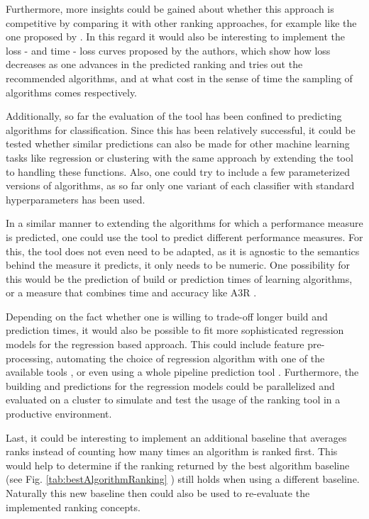 Furthermore, more insights could be gained about whether this approach is competitive by comparing it with other ranking approaches, for example like the one proposed by \citeauthor{DBLP:journals/ml/AbdulrahmanBRV18} \cite{DBLP:journals/ml/AbdulrahmanBRV18}. In this regard it would also be interesting  to implement the loss - and time - loss curves proposed by the authors, which show how loss decreases as one advances in the predicted ranking and tries out the recommended algorithms, and at what cost in the sense of time the sampling of algorithms comes respectively.

Additionally, so far the evaluation of the tool has been confined to predicting algorithms for classification. Since this has been relatively successful, it could be tested whether similar predictions can also be made for other machine learning tasks like regression or clustering with the same approach by extending the tool to handling these functions. Also, one could try to include a few parameterized versions of algorithms, as so far only one variant of each classifier with standard hyperparameters has been used. 

In a similar manner to extending the algorithms for which a performance measure is predicted, one could use the tool to predict different performance measures. For this, the tool does not even need to be adapted, as it is agnostic to the semantics behind the measure it predicts, it only needs to be numeric. One possibility for this would be the prediction of build or prediction times of learning algorithms, or a measure that combines time and accuracy like A3R \cite{DBLP:journals/ml/AbdulrahmanBRV18}.

Depending on the fact whether one is willing to trade-off longer build and prediction times, it would also be possible to fit more sophisticated regression models for the regression based approach. This could include feature pre-processing, automating the choice of regression algorithm with one of the available tools \cite{thornton2013auto} \cite{feurer2015efficient}, or even using a whole pipeline prediction tool \cite{wever2017automatic} \cite{DBLP:conf/eurogp/SaPOP17}. Furthermore, the building and predictions for the regression models could be parallelized and evaluated on a cluster to simulate and test  the usage of the ranking tool in a productive environment.

Last, it could be interesting to implement an additional baseline that averages ranks instead of counting how many times an algorithm is ranked first. This would help to determine if the ranking returned by the best algorithm baseline (see Fig. \ref{tab:bestAlgorithmRanking}
) still holds when using a different baseline. Naturally this new baseline then could also be used to re-evaluate the implemented ranking concepts. 


